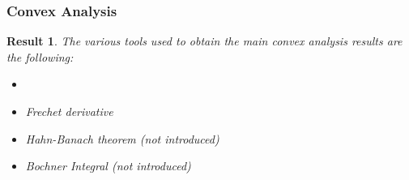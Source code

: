 \documentclass[notheorems]{beamer}
\newtheorem{res}[thm]{Result}
\theoremstyle{definition}
\theoremstyle{definition}
\begin{document}
\begin{frame}
\frametitle{Convex Analysis}

\begin{res}
The various tools used to obtain the main convex analysis results are the following:
	\begin{itemize}
	\item 
	\item Frechet derivative 
	\item Hahn-Banach theorem (not introduced)
	\item Bochner Integral (not introduced)
	\end{itemize}
\end{res}
\end{frame}
\end{document}
